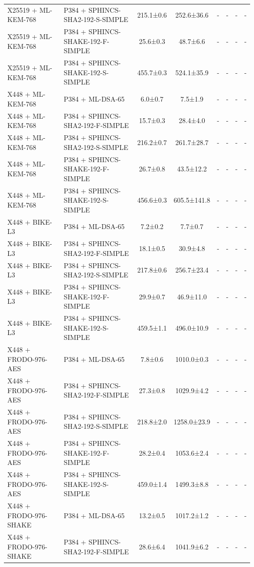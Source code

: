 \documentclass[10pt]{article}
\begin{document}
\begin{tabular}{@{}l l c c c c c c@{}}
X25519 + ML-KEM-768 & P384 + SPHINCS-SHA2-192-S-SIMPLE & 215.1±0.6 & 252.6±36.6 & - & - & - & - \\
X25519 + ML-KEM-768 & P384 + SPHINCS-SHAKE-192-F-SIMPLE & 25.6±0.3 & 48.7±6.6 & - & - & - & - \\
X25519 + ML-KEM-768 & P384 + SPHINCS-SHAKE-192-S-SIMPLE & 455.7±0.3 & 524.1±35.9 & - & - & - & - \\
X448 + ML-KEM-768 & P384 + ML-DSA-65 & 6.0±0.7 & 7.5±1.9 & - & - & - & - \\
X448 + ML-KEM-768 & P384 + SPHINCS-SHA2-192-F-SIMPLE & 15.7±0.3 & 28.4±4.0 & - & - & - & - \\
X448 + ML-KEM-768 & P384 + SPHINCS-SHA2-192-S-SIMPLE & 216.2±0.7 & 261.7±28.7 & - & - & - & - \\
X448 + ML-KEM-768 & P384 + SPHINCS-SHAKE-192-F-SIMPLE & 26.7±0.8 & 43.5±12.2 & - & - & - & - \\
X448 + ML-KEM-768 & P384 + SPHINCS-SHAKE-192-S-SIMPLE & 456.6±0.3 & 605.5±141.8 & - & - & - & - \\
X448 + BIKE-L3 & P384 + ML-DSA-65 & 7.2±0.2 & 7.7±0.7 & - & - & - & - \\
X448 + BIKE-L3 & P384 + SPHINCS-SHA2-192-F-SIMPLE & 18.1±0.5 & 30.9±4.8 & - & - & - & - \\
X448 + BIKE-L3 & P384 + SPHINCS-SHA2-192-S-SIMPLE & 217.8±0.6 & 256.7±23.4 & - & - & - & - \\
X448 + BIKE-L3 & P384 + SPHINCS-SHAKE-192-F-SIMPLE & 29.9±0.7 & 46.9±11.0 & - & - & - & - \\
X448 + BIKE-L3 & P384 + SPHINCS-SHAKE-192-S-SIMPLE & 459.5±1.1 & 496.0±10.9 & - & - & - & - \\
X448 + FRODO-976-AES & P384 + ML-DSA-65 & 7.8±0.6 & 1010.0±0.3 & - & - & - & - \\
X448 + FRODO-976-AES & P384 + SPHINCS-SHA2-192-F-SIMPLE & 27.3±0.8 & 1029.9±4.2 & - & - & - & - \\
X448 + FRODO-976-AES & P384 + SPHINCS-SHA2-192-S-SIMPLE & 218.8±2.0 & 1258.0±23.9 & - & - & - & - \\
X448 + FRODO-976-AES & P384 + SPHINCS-SHAKE-192-F-SIMPLE & 28.2±0.4 & 1053.6±2.4 & - & - & - & - \\
X448 + FRODO-976-AES & P384 + SPHINCS-SHAKE-192-S-SIMPLE & 459.0±1.4 & 1499.3±8.8 & - & - & - & - \\
X448 + FRODO-976-SHAKE & P384 + ML-DSA-65 & 13.2±0.5 & 1017.2±1.2 & - & - & - & - \\
X448 + FRODO-976-SHAKE & P384 + SPHINCS-SHA2-192-F-SIMPLE & 28.6±6.4 & 1041.9±6.2 & - & - & - & - \\

\end{tabular}
\end{document}
